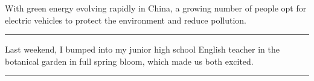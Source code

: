 \documentclass[11pt,a4paper]{article}
\newcommand{\num}[1]{\makebox[1.9em][r]{#1.}\hspace{0.3em}}
\newcommand{\wline}{\noindent\rule{\linewidth}{0.4pt}}
\begin{document}
\begin{minipage}{\linewidth}

\num{39}With green energy evolving rapidly in China, a growing number of people opt for electric vehicles to protect the environment and reduce pollution.

\vspace{0.25em}

\wline

\end{minipage}

\begin{minipage}{\linewidth}

\num{40}Last weekend, I bumped into my junior high school English teacher in the botanical garden in full spring bloom, which made us both excited.

\vspace{0.25em}

\wline

\end{minipage}
\end{document}
